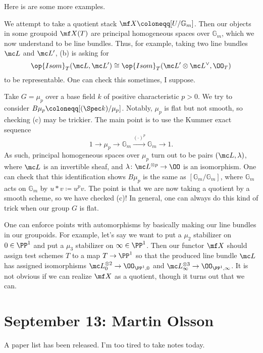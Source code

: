 \documentclass{article}
\begin{document}
Here is are some more examples.
\begin{example}
    We attempt to take a quotient stack $\mf X\coloneqq[U/\mathbb G_m]$. Then our objects in some groupoid $\mf X(T)$ are principal homogeneous spaces over $\mathbb G_m$, which we now understand to be line bundles. Thus, for example, taking two line bundles $\mc L$ and $\mc L'$, (b) is asking for
    \[\op{Isom}_T(\mc L,\mc L')\cong\op{Isom}_T(\mc L'\otimes\mc L^\lor,\OO_T)\]
    to be representable. One can check this sometimes, I suppose.
\end{example}
\begin{example}
    Take $G=\mu_p$ over a base field $k$ of positive characteristic $p>0$. We try to consider $B\mu_p\coloneqq[(\Spec k)/\mu_p]$. Notably, $\mu_p$ is flat but not smooth, so checking (c) may be trickier. The main point is to use the Kummer exact sequence
    \[1\to\mu_p\to\mathbb G_m\stackrel{(\cdot)^p}\to\mathbb G_m\to1.\]
    As such, principal homogeneous spaces over $\mu_p$ turn out to be pairs $(\mc L,\lambda)$, where $\mc L$ is an invertible sheaf, and $\lambda\colon\mc L^{\otimes p}\to\OO$ is an isomorphism. One can check that this identification shows $B\mu_p$ is the same as $[\mathbb G_m/\mathbb G_m]$, where $\mathbb G_m$ acts on $\mathbb G_m$ by $u*v\coloneqq u^pv$. The point is that we are now taking a quotient by a smooth scheme, so we have checked (c)! In general, one can always do this kind of trick when our group $G$ is flat.
\end{example}
\begin{example}
    One can enforce points with automorphisms by basically making our line bundles in our groupoids. For example, let's say we want to put a $\mu_2$ stabilizer on $0\in\PP^1$ and put a $\mu_3$ stabilizer on $\infty\in\PP^1$. Then our functor $\mf X$ should assign test schemes $T$ to a map $T\to\PP^1$ so that the produced line bundle $\mc L$ has assigned isomorphisms $\mc L_0^{\otimes2}\to\OO_{\PP^1,0}$ and $\mc L_\infty^{\otimes3}\to\OO_{\PP^1,\infty}$. It is not obvious if we can realize $\mf X$ as a quotient, though it turns out that we can.
\end{example}

\section{September 13: Martin Olsson}
A paper list has been released. I'm too tired to take notes today.
\end{document}

